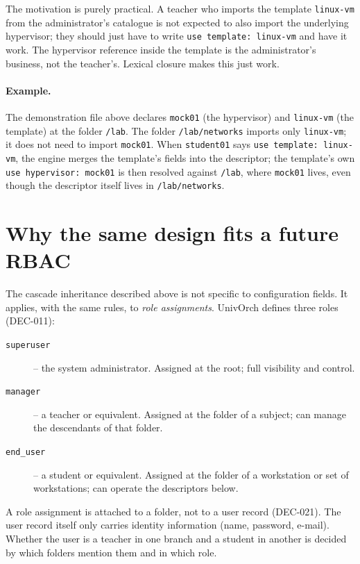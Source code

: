 The motivation is purely practical. A teacher who imports the
template \texttt{linux-vm} from the administrator's catalogue is not
expected to also import the underlying hypervisor; they should just
have to write \texttt{use template: linux-vm} and have it work. The
hypervisor reference inside the template is the administrator's
business, not the teacher's. Lexical closure makes this just work.

\paragraph{Example.}
The demonstration file above declares \texttt{mock01} (the
hypervisor) and \texttt{linux-vm} (the template) at the folder
\texttt{/lab}. The folder \texttt{/lab/networks} imports only
\texttt{linux-vm}; it does not need to import \texttt{mock01}.
When \texttt{student01} says \texttt{use template: linux-vm}, the
engine merges the template's fields into the descriptor; the
template's own \texttt{use hypervisor: mock01} is then resolved
against \texttt{/lab}, where \texttt{mock01} lives, even though
the descriptor itself lives in \texttt{/lab/networks}.

\section{Why the same design fits a future RBAC}
\label{sec:rbac-vista}

The cascade inheritance described above is not specific to
configuration fields. It applies, with the same rules, to
\emph{role assignments}. UnivOrch defines three roles (DEC-011):

\begin{description}
  \item[\texttt{superuser}] -- the system administrator. Assigned
        at the root; full visibility and control.
  \item[\texttt{manager}] -- a teacher or equivalent. Assigned at
        the folder of a subject; can manage the descendants of that
        folder.
  \item[\texttt{end\_user}] -- a student or equivalent. Assigned at
        the folder of a workstation or set of workstations; can
        operate the descriptors below.
\end{description}

A role assignment is attached to a folder, not to a user record
(DEC-021). The user record itself only carries identity information
(name, password, e-mail). Whether the user is a teacher in one
branch and a student in another is decided by which folders mention
them and in which role.

